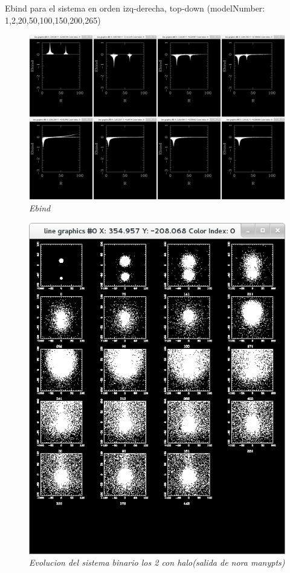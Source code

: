\documentclass[12pt]{book}
\begin{document}
Ebind para el sistema en orden izq-derecha, top-down (modelNumber: 1,2,20,50,100,150,200,265)
\begin{figure}[h!]
 \centering
 \includegraphics[scale=0.2]{imgConHaloEbindComb.png}
 \caption{\emph{Ebind}}
 \label{Fig: 5}
\end{figure}

\begin{figure}[h!]
 \centering
 \includegraphics[scale=0.4]{manyptsCH.png}
 \caption{\emph{Evolucion del sistema binario los 2 con halo(salida de nora manypts)}}
 \label{Fig: 5}
\end{figure}
\end{document}
